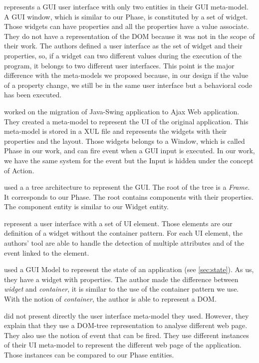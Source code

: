 \documentclass[conference]{IEEEtran}
\begin{document}
\citet{MemonWCRE2003} represents a GUI user interface with only two entities in their GUI meta-model.
A GUI window, which is similar to our Phase, is constituted by a set of widget.
Those widgets can have properties and all the properties have a value associate.
They do not have a representation of the DOM because it was not in the scope of
    their work.
The authors defined a user interface as the set of widget and their properties,
    so, if a widget can two different values during the execution of the program, 
    it belongs to two different user interfaces.
This point is the major difference with the meta-models we proposed because,
    in our design if the value of a property change, we still be in the same user interface
    but a behavioral code has been executed.

\citet{samir2007swing2script} worked on the migration of Java-Swing application to Ajax Web application.
They created a meta-model to represent the UI of the original application.
This meta-model is stored in a XUL file and represents
    the widgets with their properties and the layout.
Those widgets belongs to a Window, which is called Phase in our work, and
    can fire event when a GUI input is executed.
In our work, we have the same system for the event but the Input is hidden under the concept of Action.

\citet{shah2011reverse} used a a tree architecture to represent the GUI.
The root of the tree is a \textit{Frame}.
It corresponds to our Phase.
The root contains components with their properties.
The component entity is similar to our Widget entity.

\citet{joorabchi2012reverse} represent a user interface with a set of UI element.
Those elements are our definition of a widget without the container pattern.
For each UI element, the authors' tool are able to handle the detection
    of multiple attributes and of the event linked to the element.

\citet{memon2007eventflow} used a GUI Model to represent the state of an application (see \ref{sec:state}).
As us, they have a widget with properties.
The author made the difference between \textit{widget} and \textit{container},
    it is similar to the use of the container pattern we use.
With the notion of \textit{container}, the author is able to represent a DOM.

\citet{mesbah2012crawling} did not present directly the user interface meta-model they used.
However, they explain that they use a DOM-tree representation to
    analyse different web page.
They also use the notion of event that can be fired.
They use different instances of their UI meta-model to represent the different web page of the application.
Those instances can be compared to our Phase entities.
\end{document}
